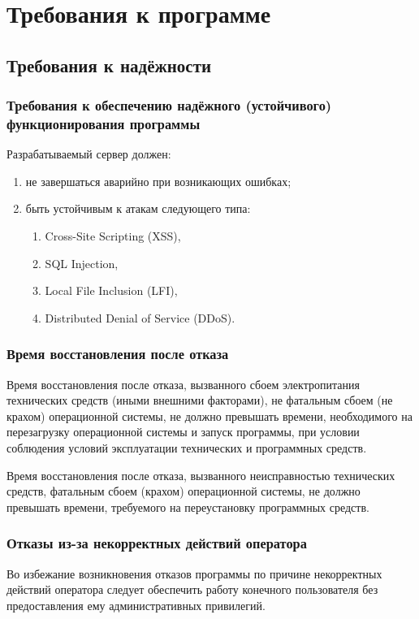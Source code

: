 \section{Требования к программе}



\subsection{Требования к надёжности}

\subsubsection{Требования к обеспечению надёжного (устойчивого) функционирования программы}

Разрабатываемый сервер должен:
\begin{enumerate}
    \item не завершаться аварийно при возникающих ошибках;
    \item быть устойчивым к атакам следующего типа:
    \begin{enumerate}
        \item Cross-Site Scripting (XSS),
        \item SQL Injection,
        \item Local File Inclusion (LFI),
        \item Distributed Denial of Service (DDoS).
    \end{enumerate}
\end{enumerate}

\subsubsection{Время восстановления после отказа}
Время восстановления после отказа, вызванного сбоем электропитания технических средств (иными внешними факторами),
не фатальным сбоем (не крахом) операционной системы, не должно превышать времени, необходимого на перезагрузку
операционной системы и запуск программы, при условии соблюдения условий эксплуатации технических и программных средств.

Время восстановления после отказа, вызванного неисправностью технических средств, фатальным сбоем (крахом) операционной
системы, не должно превышать времени, требуемого на переустановку программных средств.

\subsubsection{Отказы из-за некорректных действий оператора}
Во избежание возникновения отказов программы по причине некорректных действий оператора следует обеспечить работу
конечного пользователя без предоставления ему административных привилегий.


